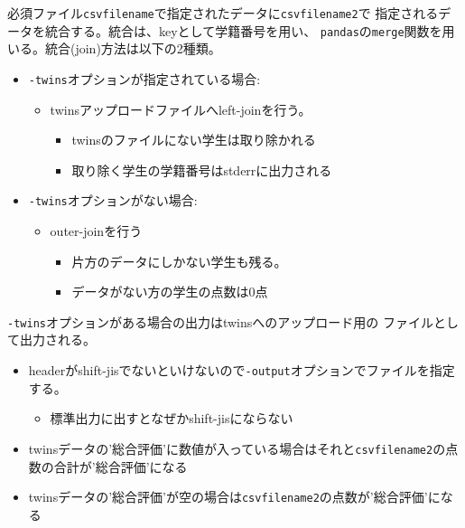 必須ファイル\texttt{csvfilename}で指定されたデータに\texttt{csvfilename2}で
指定されるデータを統合する。統合は、keyとして学籍番号を用い、
\texttt{pandas}の\texttt{merge}関数を用いる。統合(join)方法は以下の2種類。

\begin{itemize}
\item \texttt{-twins}オプションが指定されている場合:

\begin{itemize}
\item twinsアップロードファイルへleft-joinを行う。

\begin{itemize}
\item twinsのファイルにない学生は取り除かれる

\item 取り除く学生の学籍番号はstderrに出力される

\end{itemize}

\end{itemize}

\item \texttt{-twins}オプションがない場合:

\begin{itemize}
\item outer-joinを行う

\begin{itemize}
\item 片方のデータにしかない学生も残る。

\item データがない方の学生の点数は0点

\end{itemize}

\end{itemize}

\end{itemize}

\texttt{-twins}オプションがある場合の出力はtwinsへのアップロード用の
ファイルとして出力される。

\begin{itemize}
\item headerがshift-jisでないといけないので\texttt{-output}オプションでファイルを指定する。

\begin{itemize}
\item 標準出力に出すとなぜかshift-jisにならない\frownie 

\end{itemize}

\item twinsデータの'総合評価'に数値が入っている場合はそれと\texttt{csvfilename2}の点数の合計が'総合評価'になる

\item twinsデータの'総合評価'が空の場合は\texttt{csvfilename2}の点数が'総合評価'になる

\end{itemize}

